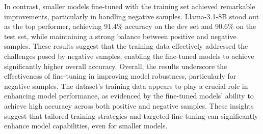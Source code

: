 In contrast, smaller models fine-tuned with the training set achieved remarkable improvements, particularly in handling negative samples. Llama-3.1-8B stood out as the top performer, achieving 91.4\% accuracy on the dev set and 90.6\% on the test set, while maintaining a strong balance between positive and negative samples. These results suggest that the training data effectively addressed the challenges posed by negative samples, enabling the fine-tuned models to achieve significantly higher overall accuracy. Overall, the results underscore the effectiveness of fine-tuning in improving model robustness, particularly for negative samples. The dataset’s training data appears to play a crucial role in enhancing model performance, as evidenced by the fine-tuned models’ ability to achieve high accuracy across both positive and negative samples. These insights suggest that tailored training strategies and targeted fine-tuning can significantly enhance model capabilities, even for smaller models.
